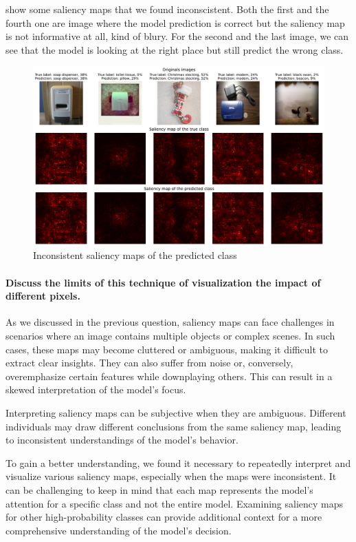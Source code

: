  show some saliency maps that we found inconscistent. Both the first and the fourth one are image where the model prediction is correct but the saliency map is not informative at all, kind of blury. For the second and the last image, we can see that the model is looking at the right place but still predict the wrong class.

\begin{figure}[H]
    \centering  
    \includegraphics[width=.95\textwidth]{figs/2b/bad_saliency_map.pdf}
    \caption{Inconsistent saliency maps of the predicted class}
    \label{fig:bad_saliency_map}
\end{figure}


\paragraph*{Discuss the limits of this technique of visualization the impact of different pixels.}
As we discussed in the previous question, saliency maps can face challenges in scenarios where an image contains multiple objects or complex scenes. In such cases, these maps may become cluttered or ambiguous, making it difficult to extract clear insights. They can also suffer from noise or, conversely, overemphasize certain features while downplaying others. This can result in a skewed interpretation of the model's focus.

Interpreting saliency maps can be subjective when they are ambiguous. Different individuals may draw different conclusions from the same saliency map, leading to inconsistent understandings of the model's behavior.

To gain a better understanding, we found it necessary to repeatedly interpret and visualize various saliency maps, especially when the maps were inconsistent. It can be challenging to keep in mind that each map represents the model's attention for a specific class and not the entire model. Examining saliency maps for other high-probability classes can provide additional context for a more comprehensive understanding of the model's decision.

